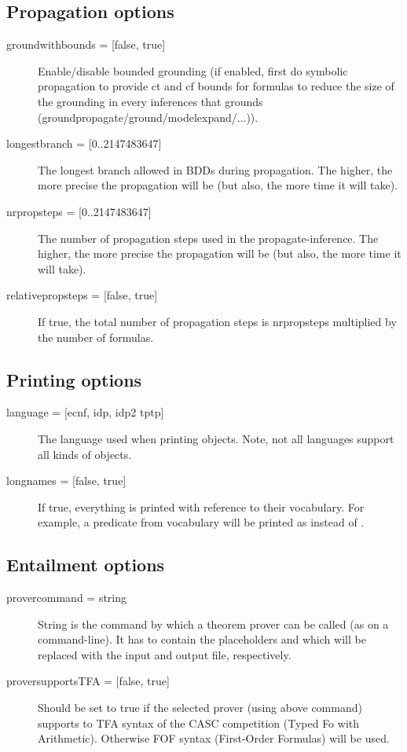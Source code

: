 \subsection{Propagation options}
\begin{description}
	\item[{groundwithbounds = [false, true]}] Enable/disable bounded grounding (if enabled, first do symbolic propagation to provide ct and cf bounds for formulas to reduce the size of the grounding in every inferences that grounds (groundpropagate/ground/modelexpand/...)).
	\item[{longestbranch = [0..2147483647]}] The longest branch allowed in BDDs during propagation. The higher, the more precise the propagation will be (but also, the more time it will take).
	\item[{nrpropsteps = [0..2147483647]}] The number of propagation steps used in the propagate-inference. The higher, the more precise the propagation will be (but also, the more time it will take).
	\item[{relativepropsteps =  [false, true]}] If true, the total number of propagation steps is nrpropsteps multiplied by the number of formulas.
\end{description}

\subsection{Printing options}
\begin{description}
	\item[{language = [ecnf, idp, idp2 %
				tptp]}] The language used when printing objects. Note, not all languages support all kinds of objects.
	\item[{longnames = [false, true]}] If true, everything is printed with reference to their vocabulary.  For example, a predicate  from vocabulary  will be printed as  instead of .
\end{description}

\subsection{Entailment options}
\begin{description}
	\item[{provercommand = string}] String is the command by which a theorem prover can be called (as on a command-line). It has to contain the placeholders  and  which will be replaced with the input and output file, respectively.
	\item[{proversupportsTFA = [false, true]}] Should be set to true if the selected prover (using above command) supports to TFA syntax of the CASC competition (Typed Fo with Arithmetic). Otherwise FOF syntax (First-Order Formulas) will be used.
\end{description}

